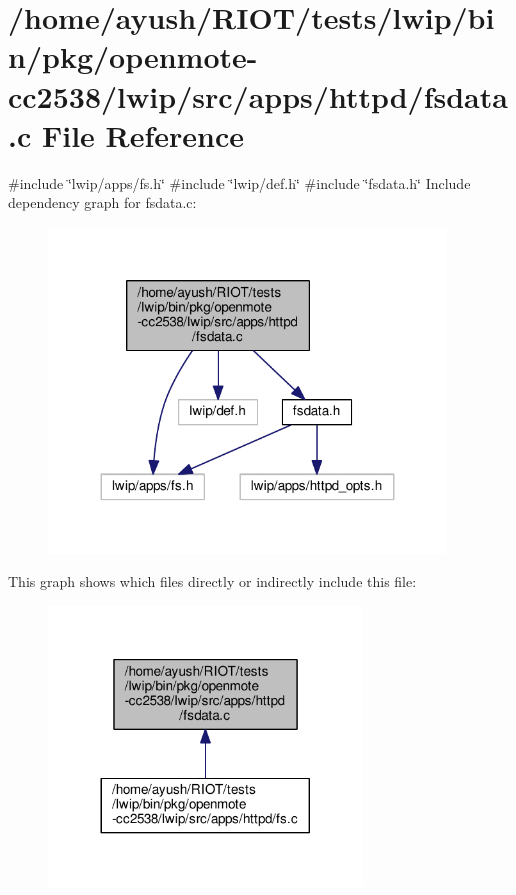\hypertarget{openmote-cc2538_2lwip_2src_2apps_2httpd_2fsdata_8c}{}\section{/home/ayush/\+R\+I\+O\+T/tests/lwip/bin/pkg/openmote-\/cc2538/lwip/src/apps/httpd/fsdata.c File Reference}
\label{openmote-cc2538_2lwip_2src_2apps_2httpd_2fsdata_8c}
{\ttfamily \#include \char`\"{}lwip/apps/fs.\+h\char`\"{}}\newline
{\ttfamily \#include \char`\"{}lwip/def.\+h\char`\"{}}\newline
{\ttfamily \#include \char`\"{}fsdata.\+h\char`\"{}}\newline
Include dependency graph for fsdata.\+c\+:
\nopagebreak
\begin{figure}[H]
\begin{center}
\leavevmode
\includegraphics[width=299pt]{openmote-cc2538_2lwip_2src_2apps_2httpd_2fsdata_8c__incl}
\end{center}
\end{figure}
This graph shows which files directly or indirectly include this file\+:
\nopagebreak
\begin{figure}[H]
\begin{center}
\leavevmode
\includegraphics[width=236pt]{openmote-cc2538_2lwip_2src_2apps_2httpd_2fsdata_8c__dep__incl}
\end{center}
\end{figure}
